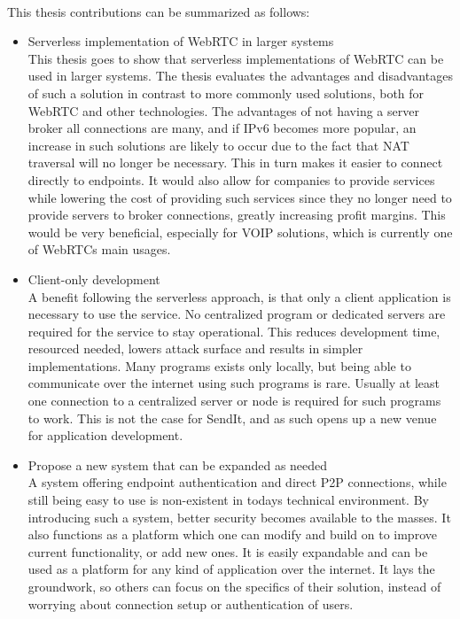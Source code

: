 \paragraph{}
This thesis contributions can be summarized as follows:
%
\begin{itemize}
	\item Serverless implementation of WebRTC in larger systems\\
	This thesis goes to show that serverless implementations of WebRTC can be used in larger systems. The thesis evaluates the advantages and disadvantages of such a solution in contrast to more commonly used solutions, both for WebRTC and other technologies. The advantages of not having a server broker all connections are many, and if IPv6 becomes more popular, an increase in such solutions are likely to occur due to the fact that NAT traversal will no longer be necessary. This in turn makes it easier to connect directly to endpoints. It would also allow for companies to provide services while lowering the cost of providing such services since they no longer need to provide servers to broker connections, greatly increasing profit margins. This would be very beneficial, especially for VOIP solutions, which is currently one of WebRTCs main usages.
	\item Client-only development\\
	A benefit following the serverless approach, is that only a client application is necessary to use the service. No centralized program or dedicated servers are required for the service to stay operational. This reduces development time, resourced needed, lowers attack surface and results in simpler implementations. Many programs exists only locally, but being able to communicate over the internet using such programs is rare. Usually at least one connection to a centralized server or node is required for such programs to work. This is not the case for SendIt, and as such opens up a new venue for application development.
	\item Propose a new system that can be expanded as needed\\
	A system offering endpoint authentication and direct P2P connections, while still being easy to use is non-existent in todays technical environment. By introducing such a system, better security becomes available to the masses. It also functions as a platform which one can modify and build on to improve current functionality, or add new ones. It is easily expandable and can be used as a platform for any kind of application over the internet. It lays the groundwork, so others can focus on the specifics of their solution, instead of worrying about connection setup or authentication of users.

\end{itemize}
